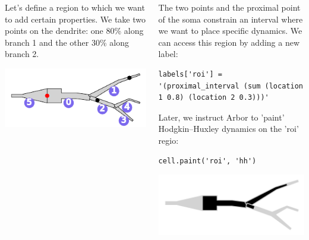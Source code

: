 \documentclass{beamer}
\newcommand*\circled[1]{\tikz[baseline=(char.base)]{\node[shape=circle,fill,inner sep=2pt] (char) {\textcolor{white}{#1}};}} %
\begin{document}
\begin{frame}[t, fragile]
\begin{columns}[onlytextwidth,T]
\begin{column}{0.33\textwidth}
          Let's define a region to which we want to add certain properties. We take two points {\color{black}\circled{-}} on the dendrite: one 80\% along branch 1 and the other 30\% along branch 2.
          \begin{center}\includegraphics[width=0.8\linewidth]{scripts/branches.pdf}\end{center}
        \end{column}

        \begin{column}{0.3\textwidth}
          \circled{3} The two points and the proximal point of the soma constrain an interval where we want to place specific dynamics. We can access this region by adding a new label:
\begin{verbatim}
labels['roi'] = '(proximal_interval (sum (location 1 0.8) (location 2 0.3)))'
\end{verbatim}
          Later, we instruct Arbor to 'paint' Hodgkin–Huxley dynamics on the 'roi' regio:
\begin{verbatim}
cell.paint('roi', 'hh')
\end{verbatim}
          \begin{center}\includegraphics[width=0.8\linewidth]{scripts/region.pdf}\end{center}
        \end{column}

      \end{columns}


\end{frame}
\end{document}
